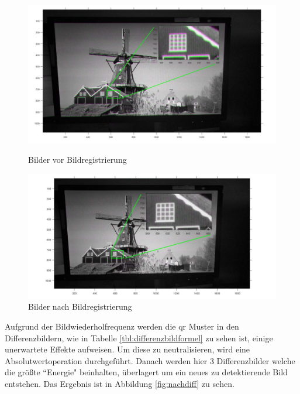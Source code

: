 \begin{figure}[H]
\centering 
\begin{minipage}[b]{0.49\textwidth} 
\centering 
\includegraphics[width=1.0\textwidth]{images/5_Implementirung/vorregistration.pdf} 
\caption{Bilder vor Bildregistrierung}
\label{fig:vorregistration}
\end{minipage}
\begin{minipage}[b]{0.49\textwidth} 
\centering 
\includegraphics[width=1.1\textwidth]{images/5_Implementirung/nachregis.pdf}
\caption{Bilder nach Bildregistrierung}
\label{fig:nachregis}
\end{minipage}
\end{figure}
 
Aufgrund der Bildwiederholfrequenz werden die \gls{qr} Muster in den Differenzbildern, wie in Tabelle \ref{tbl:differenzbildformel} zu sehen ist, einige unerwartete Effekte aufweisen. Um diese zu neutralisieren, wird eine Absolutwertoperation durchgeführt. Danach werden hier 3 Differenzbilder welche die größte ``Energie" beinhalten, überlagert um ein neues zu detektierende Bild entstehen. Das Ergebnis ist in Abbildung \ref{fig:nachdiff} zu sehen. 

